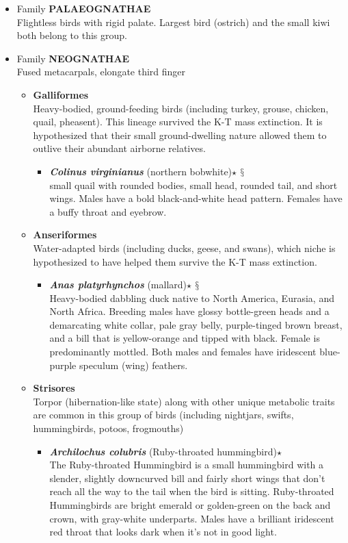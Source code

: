 \documentclass[a4paper,12pt]{article}
\begin{document}
\begin{description}
\begin{itemize}
  \item Family {\textbf{PALAEOGNATHAE}} \\ Flightless birds with rigid palate. Largest bird (ostrich) and the small kiwi both belong to this group.
  \item Family {\textbf{NEOGNATHAE}} \\ Fused metacarpals, elongate third finger
  \begin{itemize}
    \item {\textbf{Galliformes}} \\ Heavy-bodied, ground-feeding birds (including turkey, grouse, chicken, quail, pheasent). This lineage survived the K-T mass extinction. It is hypothesized that their small ground-dwelling nature allowed them to outlive their abundant airborne relatives.
    \begin{itemize}
      \item{\textbf{\textit{Colinus virginianus}} (northern bobwhite)$\star$ $\mathsection$} \\ small quail with rounded bodies, small head, rounded tail, and short wings. Males have a bold black-and-white head pattern. Females have a buffy throat and eyebrow.
    \end{itemize}
    \item {\textbf{Anseriformes}} \\ Water-adapted birds (including ducks, geese, and swans), which niche is hypothesized to have helped them survive the K-T mass extinction.
    \begin{itemize}
      \item{\textbf{\textit{Anas platyrhynchos}} (mallard)$\star$ $\mathsection$} \\ Heavy-bodied dabbling duck native to North America, Eurasia, and North Africa. Breeding males have glossy bottle-green heads and a demarcating white collar, pale gray belly, purple-tinged brown breast, and a bill that is yellow-orange and tipped with black. Female is predominantly mottled. Both males and females have iridescent blue-purple speculum (wing) feathers.
    \end{itemize}
    \item {\textbf{Strisores}} \\ Torpor (hibernation-like state) along with other unique metabolic traits are common in this group of birds (including nightjars, swifts, hummingbirds, potoos, frogmouths)
    \begin{itemize}
      \item{\textbf{\textit{Archilochus colubris}} (Ruby-throated hummingbird)$\star$} \\ The Ruby-throated Hummingbird is a small hummingbird with a slender, slightly downcurved bill and fairly short wings that don’t reach all the way to the tail when the bird is sitting. Ruby-throated Hummingbirds are bright emerald or golden-green on the back and crown, with gray-white underparts. Males have a brilliant iridescent red throat that looks dark when it’s not in good light.

\end{itemize}
\end{itemize}
\end{itemize}
\end{description}
\end{document}
